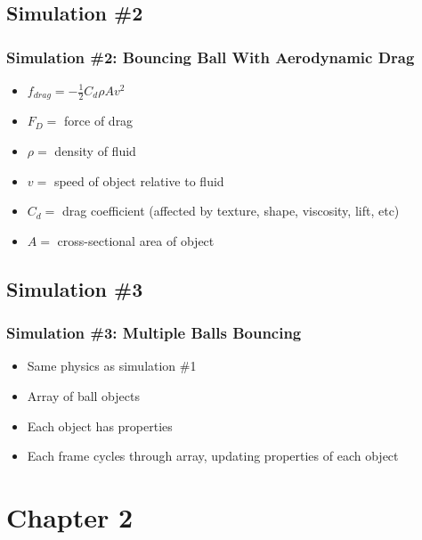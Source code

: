 \documentclass{beamer}
\begin{document}
\subsection{Simulation \#2}

\begin{frame}
\frametitle{Simulation \#2: Bouncing Ball With Aerodynamic Drag}

\begin{itemize}

\item $ 
f_{drag} = -\frac{1}{2}C_d \rho A v^2
$

\vspace{1cm}
\item  $ F_D =   $ force of drag
\item $\rho = $ density of fluid
\item $v = $ speed of object relative to fluid
\item  $C_d = $ drag coefficient (affected by texture, shape, viscosity, lift, etc)  
\item $ A = $ cross-sectional area of object


\end{itemize}





\end{frame}




\subsection{Simulation \#3}

\begin{frame}
\frametitle{Simulation \#3: Multiple Balls Bouncing}

\begin{itemize}

\item Same physics as simulation \#1
\item Array of ball objects
\item Each object has properties
\item Each frame cycles through array, updating properties of each object


\end{itemize}

\end{frame}


\section{Chapter 2}
\end{document}
